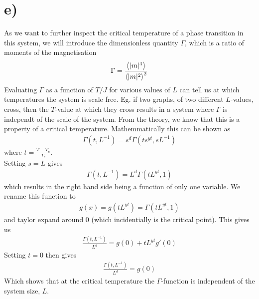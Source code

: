 \section*{e)}
    As we want to further inspect the critical temperature of a phase transition in this system, we will introduce the dimensionless quantity $\Gamma$, which is a ratio of moments of the magnetisation
    \begin{equation}
        \Gamma = \frac{\left\langle|m|^4\right\rangle}{\left\langle|m|^2\right\rangle^2}
        \label{eq:gamma}
    \end{equation}
    Evaluating $\Gamma$ as a function of $T/J$ for various values of $L$ can tell us at which temperatures the system is scale free. Eg. if two graphs, of two different $L$-values, cross, then the $T$-value at which they cross results in a system where $\Gamma$ is independt of the scale of the system. From the theory, we know that this is a property of a critical temperature. Mathemmatically this can be shown as 
    \begin{align*}
        \Gamma (t, L^{-1}) = s^d \Gamma (ts^{yt}, sL^{-1})
    \end{align*}
    where $t = \frac{T - T_c}{T_c}$.\\
    Setting $s=L$ gives 
    \begin{align*}
        \Gamma (t, L^{-1}) = L^d \Gamma (tL^{yt}, 1)
    \end{align*}
    which results in the right hand side being a function of only one variable. We rename this function to
    \begin{align*}
        g(x) = g(tL^{yt}) = \Gamma (tL^{yt}, 1)
    \end{align*} 
    and taylor expand around 0 (which incidentially is the critical point). This gives us
    \begin{align*}
        \frac{\Gamma (t, L^{-1})}{L^d} = g(0) + tL^{yt}g'(0)
    \end{align*}
    Setting $t=0$ then gives 
    \begin{align*}
        \frac{\Gamma (t, L^{-1})}{L^d} = g(0)
    \end{align*}
    Which shows that at the critical temperature the $\Gamma$-function is independent of the system size, $L$. 


